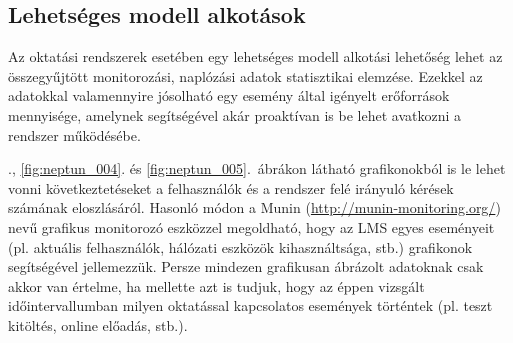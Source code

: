\subsection{Lehetséges modell alkotások}

Az oktatási rendszerek esetében egy lehetséges modell alkotási lehetőség lehet az összegyűjtött monitorozási, naplózási adatok statisztikai elemzése. Ezekkel az adatokkal valamennyire jósolható egy esemény által igényelt erőforrások mennyisége, amelynek segítségével akár proaktívan is be lehet avatkozni a rendszer működésébe.

., \ref{fig:neptun_004}. és \ref{fig:neptun_005}.~ábrákon látható grafikonokból is le lehet vonni következtetéseket a felhasználók és a rendszer felé irányuló kérések számának eloszlásáról. Hasonló módon a Munin (\href{http://munin-monitoring.org/}{http://munin-monitoring.org/}) nevű grafikus monitorozó eszközzel megoldható, hogy az LMS egyes eseményeit (pl. aktuális felhasználók, hálózati eszközök kihasználtsága, stb.) grafikonok segítségével jellemezzük. Persze mindezen grafikusan ábrázolt adatoknak csak akkor van értelme, ha mellette azt is tudjuk, hogy az éppen vizsgált időintervallumban milyen oktatással kapcsolatos események történtek (pl. teszt kitöltés, online előadás, stb.). 

